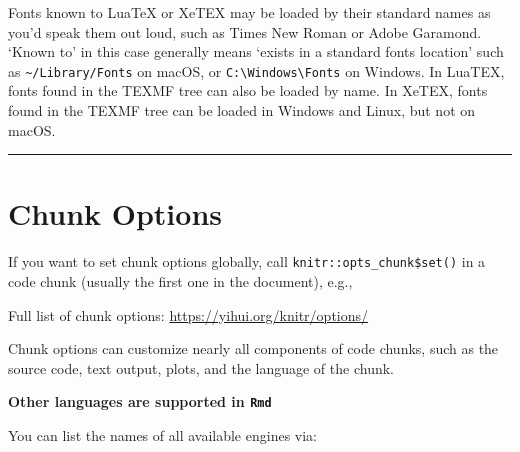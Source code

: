 \documentclass[
  a4paper,
  twoside,
  openright]{book}
\newenvironment{Shaded}{\begin{snugshade}}{\end{snugshade}}
\newcommand{\InformationTok}[1]{\textcolor[rgb]{0.56,0.35,0.01}{\textbf{\textit{#1}}}}
\theoremstyle{definition}
\theoremstyle{definition}
\theoremstyle{definition}
\theoremstyle{definition}
\theoremstyle{remark}
\begin{document}
Fonts known to LuaTeX or XeTEX may be loaded by their standard names as you'd speak them out loud, such as Times New Roman or Adobe Garamond. `Known to' in this case generally means `exists in a standard fonts location' such as \texttt{\textasciitilde{}/Library/Fonts} on macOS, or \texttt{C:\textbackslash{}Windows\textbackslash{}Fonts} on Windows. In LuaTEX, fonts found in the TEXMF tree can also be loaded by name. In XeTEX, fonts found in the TEXMF tree can be loaded in Windows and Linux, but not on macOS.

\begin{center}\rule{0.5\linewidth}{0.5pt}\end{center}

\section{Chunk Options}\label{chunk-options}

If you want to set chunk options globally, call \texttt{knitr::opts\_chunk\$set()} in a code chunk (usually the first one in the document), e.g.,

\begin{Shaded}
\end{Shaded}

Full list of chunk options: \url{https://yihui.org/knitr/options/}

Chunk options can customize nearly all components of code chunks, such as the source code, text output, plots, and the language of the chunk.

\textbf{Other languages are supported in \texttt{Rmd}}

You can list the names of all available engines via:
\end{document}
